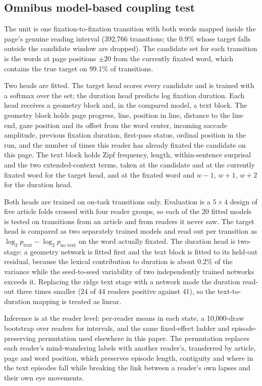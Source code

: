 \documentclass[11pt]{article}
\begin{document}
\subsection{Omnibus model-based coupling test}

The unit is one fixation-to-fixation transition with both words mapped inside the page's genuine
reading interval (392,766 transitions; the 0.9\% whose target falls outside the candidate window
are dropped). The candidate set for each transition is the words at page positions $\pm20$ from
the currently fixated word, which contains the true target on 99.1\% of transitions.

Two heads are fitted. The target head scores every candidate and is trained with a softmax over
the set; the duration head predicts log fixation duration. Each head receives a geometry block
and, in the compared model, a text block. The geometry block holds page progress, line, position
in line, distance to the line end, gaze position and its offset from the word center, incoming
saccade amplitude, previous fixation duration, first-pass status, ordinal position in the run,
and the number of times this reader has already fixated the candidate on this page. The text
block holds Zipf frequency, length, within-sentence surprisal and the two extended-context
terms, taken at the candidate and at the currently fixated word for the target head, and at the
fixated word and $w-1$, $w+1$, $w+2$ for the duration head.

Both heads are trained on on-task transitions only. Evaluation is a $5\times4$ design of five
article folds crossed with four reader groups, so each of the 20 fitted models is tested on
transitions from an article and from readers it never saw. The target head is compared as two
separately trained models and read out per transition as
$\log_2 p_{\text{text}} - \log_2 p_{\text{no text}}$ on the word actually fixated. The duration
head is two-stage: a geometry network is fitted first and the text block is fitted to its
held-out residual, because the lexical contribution to duration is about 0.2\% of the variance
while the seed-to-seed variability of two independently trained networks exceeds it. Replacing
the ridge text stage with a network made the duration read-out three times smaller (24 of 44
readers positive against 41), so the text-to-duration mapping is treated as linear.

Inference is at the reader level: per-reader means in each state, a 10,000-draw bootstrap over
readers for intervals, and the same fixed-effect ladder and episode-preserving permutation used
elsewhere in this paper. The permutation replaces each reader's mind-wandering labels with
another reader's, transferred by article, page and word position, which preserves episode
length, contiguity and where in the text episodes fall while breaking the link between a
reader's own lapses and their own eye movements.
\end{document}
